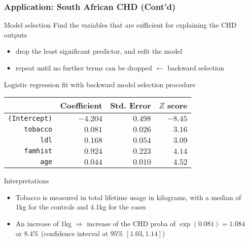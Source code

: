 \documentclass[compress, smaller, serif, 9pt]{beamer}
\newcommand{\structuretext}[1]{{\usebeamercolor[fg]{structure} #1}}
\begin{document}
\begin{frame}
  \frametitle{Application: South African CHD (Cont'd)}

\begin{block}{Model selection}
Find the variables that are sufficient for explaining the CHD outputs\\
\begin{itemize}
   \item drop the least significant predictor, and refit the model
   \item repeat until no further terms can be dropped  $\leftarrow$ \structuretext{backward selection}
\end{itemize}
\end{block}
\vspace{-2mm}
\begin{block}{Logistic regression fit with backward model selection procedure}
\begin{center}
\small
\begin{tabular}{rrrr}\hline
& Coefficient & Std. Error & $Z$ score\\
\hline
\texttt{(Intercept)} & $-4.204$ & $0.498$ & $-8.45$\\
\texttt{tobacco} & $0.081$ & $0.026$ & $3.16$\\
\texttt{ldl} & $0.168$ & $0.054$ & $3.09$\\
\texttt{famhist} & $0.924$ & $0.223$ & $4.14$\\
\texttt{age} & $0.044$ & $0.010$ & $4.52$\\
\hline
\end{tabular} 
\end{center}
\end{block}
\vspace{-6mm}
\begin{block}{Interpretations}
\begin{itemize}
   \item Tobacco is measured in total lifetime usage in kilograms, with a median of 1kg
   for the controls and 4.1kg for the cases
   \item An increase of  1kg $\Rightarrow$ increase of the CHD proba of 
    $\exp{(0.081)}=1.084$ or $8.4$\% (confidence interval at $95$\% $[1.03,1.14]$)
\end{itemize}
\end{block}
\end{frame}
\end{document}
